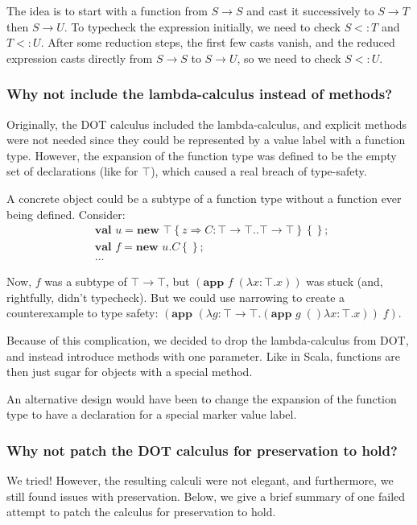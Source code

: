 \documentclass[9pt]{sigplanconf}
\newcommand{\sub}{<:}
\newcommand{\tfun}{\rightarrow}
\newcommand{\refine}[2]{\left\{#1 \Rightarrow #2 \right\}}
\newcommand{\ldefs}[1]{\left\{#1\right\}}
\newcommand{\abs}[3]{\lambda #1\!:\!#2.#3}
\newcommand{\mlnew}[3]{\textbf{val }#1 = \textbf{new }#2 ;\;\\&#3}
\newcommand{\Ldecl}[3]{#1 : #2..#3}%
\newcommand{\Top}{\top}%
\newcommand{\app}[2]{(\textbf{app }#1\;#2)}
\begin{document}
The idea is to start with a function from $S \tfun S$ and cast it
successively to $S \tfun T$ then $S \tfun U$. To typecheck the
expression initially, we need to check $S \sub T$ and $T \sub
U$. After some reduction steps, the first few casts vanish, and the
reduced expression casts directly from $S \tfun S$ to $S \tfun U$, so
we need to check $S \sub U$.

\subsubsection{Why not include the lambda-calculus instead of methods?}

Originally, the DOT calculus included the lambda-calculus, and
explicit methods were not needed since they could be represented by a
value label with a function type. However, the expansion of the
function type was defined to be the empty set of declarations (like
for $\Top$), which caused a real breach of type-safety.

A concrete object could be a subtype of a function type without a
function ever being defined. Consider:
\begin{align*}
&\mlnew u {\Top \refine z {\Ldecl C {\Top \tfun \Top} {\Top \tfun \Top}} \ldefs{}} {
\mlnew f {u.C \ldefs{}} {
\ldots
}}
\end{align*}

Now, $f$ was a subtype of $\Top \tfun \Top$, but $\app f {(\abs x \Top
  x)}$ was stuck (and, rightfully, didn't typecheck). But we could use
narrowing to create a counterexample to type safety: $\app {(\abs g
  {\Top \tfun \Top} {\app g (\abs x \Top x)})} f$.

Because of this complication, we decided to drop the lambda-calculus
from DOT, and instead introduce methods with one parameter. Like in
Scala, functions are then just sugar for objects with a special
method.

An alternative design would have been to change the expansion of the
function type to have a declaration for a special marker value label.

\subsubsection{Why not patch the DOT calculus for preservation to hold?}\label{pres-patch}

We tried! However, the resulting calculi were not elegant, and
furthermore, we still found issues with preservation. Below, we give a
brief summary of one failed attempt to patch the calculus for
preservation to hold.
\end{document}
